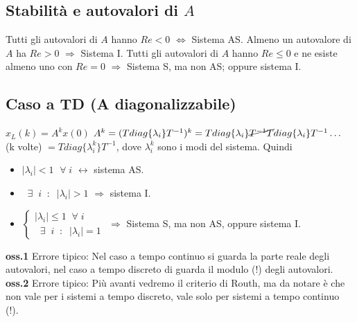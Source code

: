 \subsection{Stabilità e autovalori di $A$}
Tutti gli autovalori di $A$ hanno $Re <0$ $\Longleftrightarrow$ Sistema AS.\newline
\newline
Almeno un autovalore di $A$ ha $Re > 0$ $\Longrightarrow$ Sistema I.\newline
\newline
Tutti gli autovalori di $A$ hanno $Re \leq 0$ e ne esiste almeno uno con $Re = 0$ $\Longrightarrow$ Sistema S, ma non AS; oppure sistema I.
\subsection{Caso a TD (A diagonalizzabile)}
$x_L(k) = A^k x(0)$\newline
$A^k = (T diag\{\lambda_i\} T^{-1})^k = T diag\{\lambda_i\}\cancel{T^{-1}T} diag\{\lambda_i\} T^{-1} \dots$ (k volte) $= T diag\{\lambda_i^k\}T^{-1}$, dove $\lambda_i^{k}$ sono i modi del sistema.\newline
\newline
Quindi
\begin{itemize}
    \item $|\lambda_i| < 1$ $\;\forall\;i$ $\longleftrightarrow$ sistema AS.
    \item $\;\;\exists\;\; i \;\;:\;\; |\lambda_i| > 1$ $\Longrightarrow$ sistema I.
    \item $\begin{cases}
        |\lambda_i| \leq 1 \;\;\forall\; i\\
        \;\;\exists\;\;i \;\;:\;\;|\lambda_i| = 1 
    \end{cases}$ $\Longrightarrow$ Sistema S, ma non AS, oppure sistema I.
\end{itemize}
\textbf{oss.1} Errore tipico: Nel caso a tempo continuo si guarda la parte reale degli autovalori, nel caso a tempo discreto di guarda il modulo (!) degli autovalori.\newline
\textbf{oss.2} Errore tipico: Più avanti vedremo il criterio di Routh, ma da notare è che non vale per i sistemi a tempo discreto, vale solo per sistemi a tempo continuo (!).
